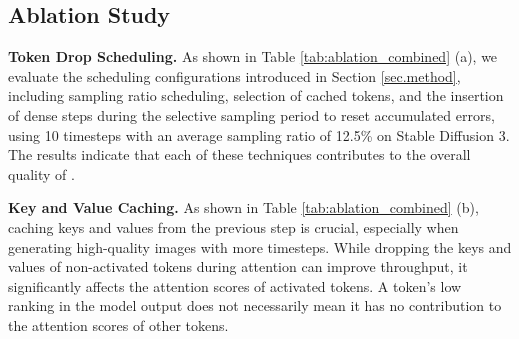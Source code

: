\subsection{Ablation Study}

\textbf{Token Drop Scheduling.} As shown in Table \ref{tab:ablation_combined} (a), we evaluate the scheduling configurations introduced in Section \ref{sec.method}, including sampling ratio scheduling, selection of cached tokens, and the insertion of dense steps during the selective sampling period to reset accumulated errors, using 10 timesteps with an average sampling ratio of 12.5\% on Stable Diffusion 3. The results indicate that each of these techniques contributes to the overall quality of \ourmethod{}.

\noindent \textbf{Key and Value Caching.} As shown in Table \ref{tab:ablation_combined} (b), caching keys and values from the previous step is crucial, especially when generating high-quality images with more timesteps. While dropping the keys and values of non-activated tokens during attention can improve throughput, it significantly affects the attention scores of activated tokens. A token's low ranking in the model output does not necessarily mean it has no contribution to the attention scores of other tokens.